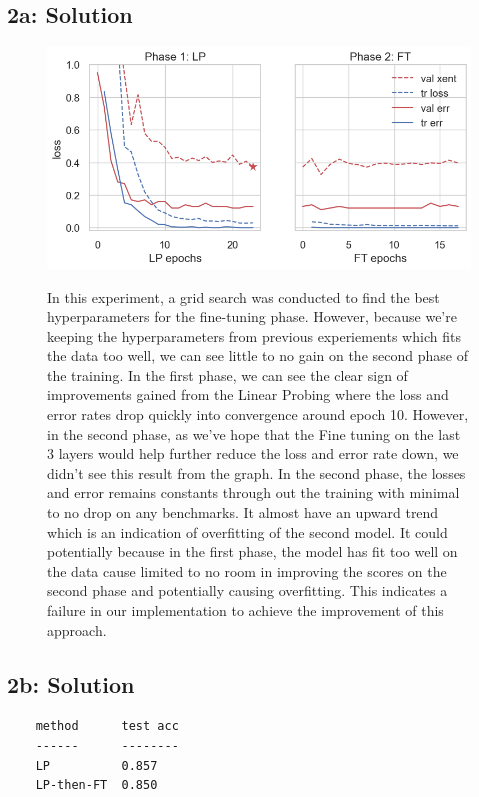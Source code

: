\documentclass[10pt]{article}
\begin{document}
\subsection{2a: Solution}
\renewcommand{\thefigure}{2a}
 \begin{figure}[!h]
     \centering
     \includegraphics[height=.4\textwidth]{./Figure 2A.png}
     \label{fig:2a}
\caption{
  In this experiment, a grid search was conducted to find the best
  hyperparameters for the fine-tuning phase. However, because we're keeping the
  hyperparameters from previous experiements which fits the data too well, we can see little to no
  gain on the second phase of the training. In the first phase, we can see the
  clear sign of improvements gained from the Linear Probing where the loss and
  error rates drop quickly into convergence around epoch 10. However, in the
  second phase, as we've hope that the Fine tuning on the last 3 layers would
  help further reduce the loss and error rate down, we didn't see this result
  from the graph. In the second phase, the losses and error remains constants
  through out the training with minimal to no drop on any benchmarks. It almost
  have an upward trend which is an indication of overfitting of the second
  model. It could potentially because in the first phase, the model has fit too
  well on the data cause limited to no room in improving the scores on the
  second phase and potentially causing overfitting. This indicates a failure in our implementation to achieve the improvement of this
  approach.
}%
 \end{figure}

\subsection{2b: Solution}

\begin{verbatim}
    method      test acc
    ------      --------
    LP          0.857
    LP-then-FT  0.850
\end{verbatim}
\end{document}
